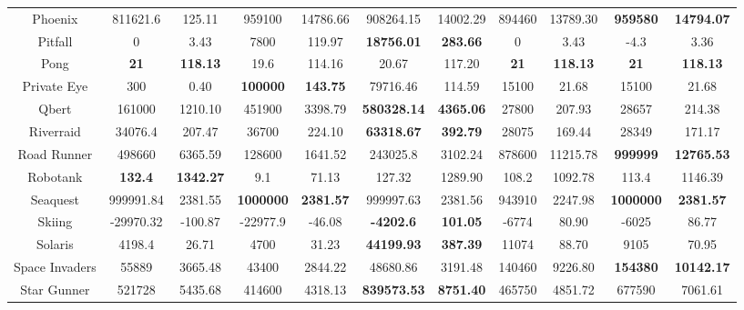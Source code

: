 \documentclass[nohyperref]{article}
\newcommand{\best}[1]{\textbf{#1}}
\theoremstyle{plain}
\begin{document}
\begin{table}[!hb]
\begin{center}
\begin{tabular}{| c| c c| c c| c c| c c| c c|}
 Phoenix & 811621.6       & 125.11  & 959100 &14786.66 &908264.15&14002.29         &894460            &13789.30              &\textbf{959580}	          &\textbf{14794.07}\\
 Pitfall & 0              & 3.43    & 7800   & 119.97&\textbf{18756.01}&\textbf{283.66}             &0                 &3.43                  &-4.3            &3.36\\
 Pong    & \textbf{21}             & \textbf{118.13}  & 19.6   & 114.16   & 20.67& 117.20           &\best{21}         &\best{118.13}         &\textbf{21}     &\textbf{118.13}\\
 Private Eye & 300        & 0.40    & \textbf{100000} & \textbf{143.75}& 79716.46&114.59            &15100             &21.68                 &15100           &21.68\\
 Qbert  & 161000          & 1210.10 & 451900 & 3398.79&\textbf{580328.14}&\textbf{4365.06}          &27800             &207.93                &28657           &214.38\\
 Riverraid & 34076.4      & 207.47  & 36700  & 224.10 & \textbf{63318.67}&\textbf{392.79}           &28075             &169.44                &28349           &171.17\\
 Road Runner & 498660     & 6365.59 & 128600 & 1641.52  & 243025.8&3102.24                          &878600            &11215.78       &\textbf{999999} &\textbf{12765.53}\\
 Robotank   & \textbf{132.4}       & \textbf{1342.27} & 9.1    & 71.13 &127.32 &1289.90             &108.2             &1092.78               &113.4           &1146.39\\
 Seaquest  & 999991.84    & 2381.55 & \textbf{1000000} & \textbf{2381.57}&999997.63&2381.56         &943910	           &2247.98        &\textbf{1000000}          &\textbf{2381.57}\\
 Skiing & -29970.32       & -100.87 & -22977.9 & -46.08 & \textbf{-4202.6}  &\textbf{101.05}        &-6774             &80.90                 &-6025	       &86.77\\
 Solaris & 4198.4         & 26.71   & 4700     & 31.23  & \textbf{44199.93}& \textbf{387.39}        &11074             &88.70                 &9105            &70.95\\
 Space Invaders & 55889   & 3665.48 & 43400    & 2844.22 & 48680.86 & 3191.48                       &140460            &9226.80               &\textbf{154380} &\textbf{10142.17}\\
 Star Gunner & 521728     & 5435.68 & 414600   &4318.13&\textbf{839573.53}&\textbf{8751.40}         &465750            &4851.72               &677590	         &7061.61\\

\end{tabular}
\end{center}
\end{table}
\end{document}
